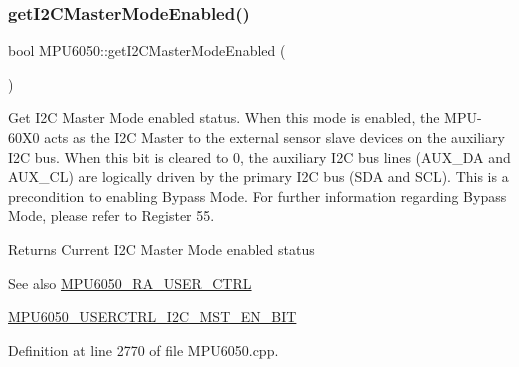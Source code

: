 \subsubsection{\texorpdfstring{getI2CMasterModeEnabled()}{getI2CMasterModeEnabled()}}
{\footnotesize\ttfamily bool M\+P\+U6050\+::get\+I2\+C\+Master\+Mode\+Enabled (\begin{DoxyParamCaption}{ }\end{DoxyParamCaption})}

Get I2C Master Mode enabled status. When this mode is enabled, the M\+P\+U-\/60\+X0 acts as the I2C Master to the external sensor slave devices on the auxiliary I2C bus. When this bit is cleared to 0, the auxiliary I2C bus lines (A\+U\+X\+\_\+\+DA and A\+U\+X\+\_\+\+CL) are logically driven by the primary I2C bus (S\+DA and S\+CL). This is a precondition to enabling Bypass Mode. For further information regarding Bypass Mode, please refer to Register 55. \begin{DoxyReturn}{Returns}
Current I2C Master Mode enabled status 
\end{DoxyReturn}
\begin{DoxySeeAlso}{See also}
\mbox{\hyperlink{MPU6050_8h_acd4c638a6f677a42ecb9a3d7612d087a}{M\+P\+U6050\+\_\+\+R\+A\+\_\+\+U\+S\+E\+R\+\_\+\+C\+T\+RL}} 

\mbox{\hyperlink{MPU6050_8h_a1974fd2b8e743e0c5517ff903da5f99a}{M\+P\+U6050\+\_\+\+U\+S\+E\+R\+C\+T\+R\+L\+\_\+\+I2\+C\+\_\+\+M\+S\+T\+\_\+\+E\+N\+\_\+\+B\+IT}} 
\end{DoxySeeAlso}


Definition at line 2770 of file M\+P\+U6050.\+cpp.


\begin{DoxyCode}{0}

\end{DoxyCode}
\mbox{\label{classMPU6050_ae15f6043a74c9c9bf9754824802ce8d3}} 
